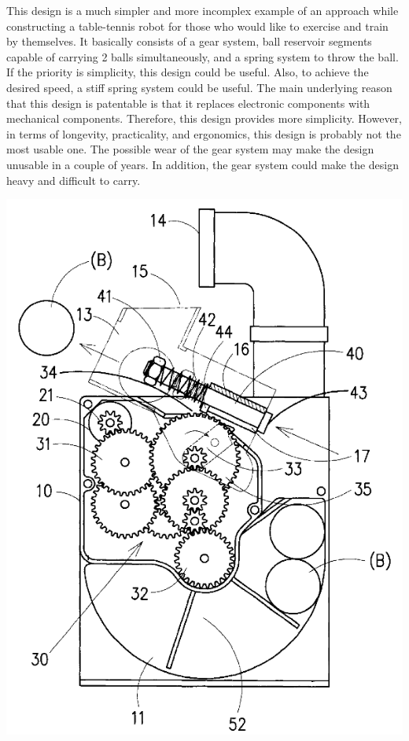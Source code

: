 \documentclass[12pt]{article}
\begin{document}
\begin{minipage}{0.7\textwidth}  %
    This design is a much simpler and more incomplex example of an approach while constructing a table-tennis robot for those who would like to exercise and train by themselves. It basically consists of a gear system, ball reservoir segments capable of carrying 2 balls simultaneously, and a spring system to throw the ball. If the priority is simplicity, this design could be useful. Also, to achieve the desired speed, a stiff spring system could be useful. The main underlying reason that this design is patentable is that it replaces electronic components with mechanical components. Therefore, this design provides more simplicity. However, in terms of longevity, practicality, and ergonomics, this design is probably not the most usable one. The possible wear of the gear system may make the design unusable in a couple of years. In addition, the gear system could make the design heavy and difficult to carry.
\end{minipage}%
\hfill
\begin{minipage}{0.28\textwidth}  %
    \centering
    \includegraphics[width=\textwidth]{figures/patent2-1.png}
    \label{fig:pt2-1}
\end{minipage}
\end{document}
